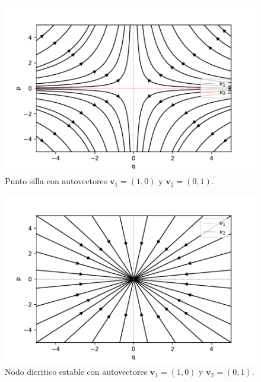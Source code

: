 \documentclass[12pt,a4paper]{article}
\numberwithin{equation}{section}
\numberwithin{figure}{section}
\newcommand{\vn}{\mathbf{v}}
\begin{document}
\begin{figure}[h!] \centering
\includegraphics[scale=0.9]{punto-silla.pdf}
\caption{Punto silla con autovectores $\vn_1=(1,0)$ y $\vn_2 = (0,1)$.}
\label{Fig:03-puntosilla}
\end{figure}

\newpage

\begin{figure}[h!] \centering
\includegraphics[scale=0.9]{nodo-dicritico-estable.pdf}
\caption{Nodo dicritico estable con autovectores $\vn_1=(1,0)$ y $\vn_2 = (0,1)$.}
\label{Fig:04-nodo-dicritico-estable}
\end{figure}
\end{document}

